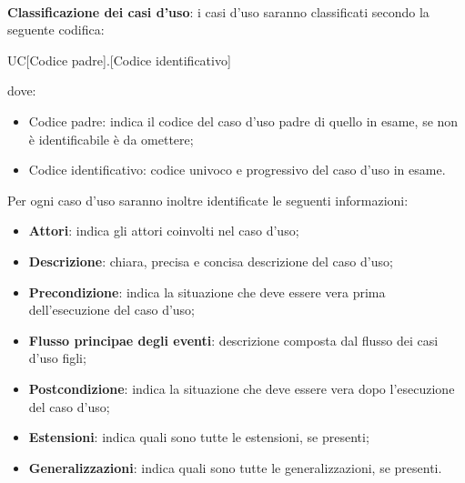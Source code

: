 	~\\ \textbf{Classificazione dei casi d'uso}: i casi d’uso saranno classificati secondo la seguente codifica:
		\begin{center}
			UC[Codice padre].[Codice identificativo]
		\end{center}
	dove:
		\begin{itemize}
			\item Codice padre: indica il codice del caso d’uso padre di quello in esame, se non è identificabile è da omettere;
			\item Codice identificativo: codice univoco e progressivo del caso d’uso in esame.
		\end{itemize}
	Per ogni caso d’uso saranno inoltre identificate le seguenti informazioni:
		\begin{itemize}
			\item \textbf{Attori}: indica gli attori coinvolti nel caso d’uso;
			\item \textbf{Descrizione}: chiara, precisa e concisa descrizione del caso d’uso;
			\item \textbf{Precondizione}: indica la situazione che deve essere vera prima dell’esecuzione del caso d’uso;
			\item \textbf{Flusso principae degli eventi}: descrizione composta dal flusso dei casi d’uso figli;
			\item \textbf{Postcondizione}: indica la situazione che deve essere vera dopo l’esecuzione del caso d’uso;
			\item \textbf{Estensioni}: indica quali sono tutte le estensioni, se presenti;
			\item \textbf{Generalizzazioni}: indica quali sono tutte le generalizzazioni, se presenti.
		\end{itemize}
	
